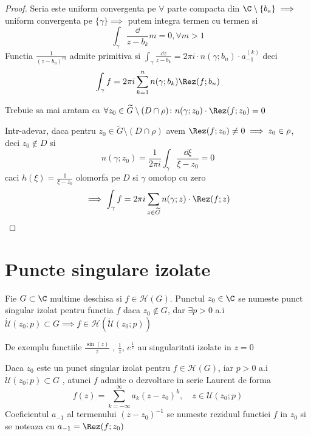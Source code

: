 \begin{theorem}
\begin{proof}
        Seria este uniform convergenta pe $\forall$ parte compacta din
        $\C \setminus \{b_a \} \implies$ uniform convergenta pe
        $\{ \gamma \} \implies$ putem integra termen cu termen si
        \[
            \int_{\gamma} \frac{\dd}{z-b_k} m = 0 , \forall m>1
        \]
        Functia $\displaystyle \frac{1}{(z-b_n)^m}$ admite primitiva si
        $\displaystyle
            \int_{\gamma} \frac{\dd z} {z - b_k} = 2 \pi i \cdot n(\gamma;b_n) \cdot a_{-1}^{(k)}
        $ deci
        \[
            \int_{\gamma} f = 2 \pi i \sum_{k=1}^{n} n(\gamma; b_k) \Rez(f;b_n)
        \]

        Trebuie sa mai aratam ca $\forall z_0 \in \widetilde{G} \setminus(D \cap \rho)
        \colon n(\gamma; z_0)\cdot \Rez(f;z_0) = 0$

        Intr-adevar, daca pentru
        $z_0\in \widetilde{G} \setminus (D\cap\rho)$ avem
        $\Rez(f;z_0) \neq 0 \implies z_0 \in \rho $, deci $z_0\notin D$ si
        \[
            n(\gamma;z_0) = \frac{1}{2 \pi i} \int_{\gamma}
            \frac{\dd \xi}{\xi - z_0} = 0
        \]
        caci $h(\xi) = \frac{1}{\xi - z_0}$ olomorfa pe $D$ si $\gamma$ omotop cu zero
        \[
            \implies \int_{\gamma} f = 2 \pi i \sum_{z\in \widetilde{G}} n(\gamma;z) \cdot \Rez(f;z)
        \]

    \end{proof}
\end{theorem}

\section{Puncte singulare izolate}

\begin{definition}
    Fie $G\subset \C$ multime deschisa si $f\in\mathcal{H}(G)$. Punctul $z_0 \in \C$
    se numeste punct singular izolat pentru functia $f$ daca $z_0 \notin G$, dar
    $\exists p>0$ a.i
    $\mathcal{\dot{U}}(z_0;p)\subset G \implies f \in \mathcal{H}(\mathcal{\dot{U}}(z_0;p))$
\end{definition}

\begin{observation}
    De exemplu functiile $\frac{\sin(z)}{z}$ , $\frac{1}{z}$, $e^{\frac{1}{z}}$
    au singularitati izolate in $z=0$
\end{observation}

\begin{observation}
    Daca $z_0$ este un punct singular izolat pentru $f\in\mathcal{H}(G)$, iar
    $p>0$ a.i $\mathcal{\dot{U}}(z_0;p)\subset G$ , atunci $f$ admite o dezvoltare in
    serie Laurent de forma
    \[
        f(z) = \sum_{k=-\infty}^{\infty} a_{k}(z-z_0)^{k},\quad z\in \mathcal{\dot{U}}(z_0;p)
    \]
    Coeficientul $a_{-1}$ al termenului $(z-z_0)^{-1}$ se numeste reziduul functiei $f$
    in $z_0$ si se noteaza cu $a_{-1} = \Rez(f;z_0)$
\end{observation}


